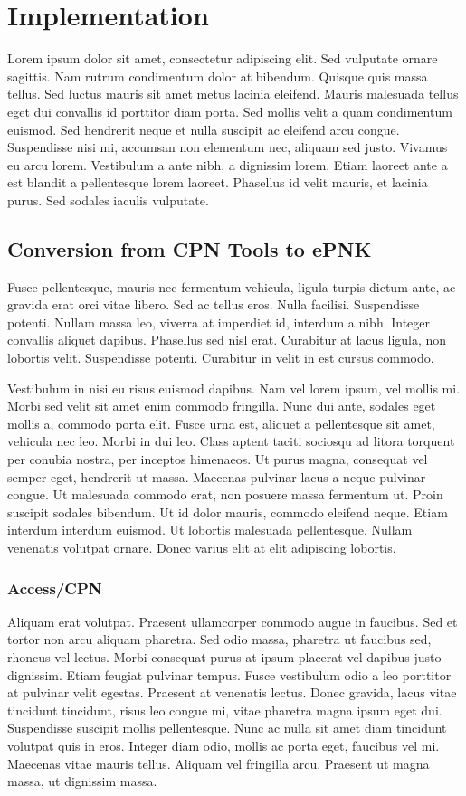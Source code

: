 \chapter{Implementation}
\label{chap:implementation}

Lorem ipsum dolor sit amet, consectetur adipiscing elit. Sed vulputate ornare sagittis. Nam rutrum condimentum dolor at bibendum. Quisque quis massa tellus. Sed luctus mauris sit amet metus lacinia eleifend. Mauris malesuada tellus eget dui convallis id porttitor diam porta. Sed mollis velit a quam condimentum euismod. Sed hendrerit neque et nulla suscipit ac eleifend arcu congue. Suspendisse nisi mi, accumsan non elementum nec, aliquam sed justo. Vivamus eu arcu lorem. Vestibulum a ante nibh, a dignissim lorem. Etiam laoreet ante a est blandit a pellentesque lorem laoreet. Phasellus id velit mauris, et lacinia purus. Sed sodales iaculis vulputate.


\section{Conversion from CPN Tools to ePNK}
Fusce pellentesque, mauris nec fermentum vehicula, ligula turpis dictum ante, ac gravida erat orci vitae libero. Sed ac tellus eros. Nulla facilisi. Suspendisse potenti. Nullam massa leo, viverra at imperdiet id, interdum a nibh. Integer convallis aliquet dapibus. Phasellus sed nisl erat. Curabitur at lacus ligula, non lobortis velit. Suspendisse potenti. Curabitur in velit in est cursus commodo.

Vestibulum in nisi eu risus euismod dapibus. Nam vel lorem ipsum, vel mollis mi. Morbi sed velit sit amet enim commodo fringilla. Nunc dui ante, sodales eget mollis a, commodo porta elit. Fusce urna est, aliquet a pellentesque sit amet, vehicula nec leo. Morbi in dui leo. Class aptent taciti sociosqu ad litora torquent per conubia nostra, per inceptos himenaeos. Ut purus magna, consequat vel semper eget, hendrerit ut massa. Maecenas pulvinar lacus a neque pulvinar congue. Ut malesuada commodo erat, non posuere massa fermentum ut. Proin suscipit sodales bibendum. Ut id dolor mauris, commodo eleifend neque. Etiam interdum interdum euismod. Ut lobortis malesuada pellentesque. Nullam venenatis volutpat ornare. Donec varius elit at elit adipiscing lobortis.

\subsection{Access/CPN}
Aliquam erat volutpat. Praesent ullamcorper commodo augue in faucibus. Sed et tortor non arcu aliquam pharetra. Sed odio massa, pharetra ut faucibus sed, rhoncus vel lectus. Morbi consequat purus at ipsum placerat vel dapibus justo dignissim. Etiam feugiat pulvinar tempus. Fusce vestibulum odio a leo porttitor at pulvinar velit egestas. Praesent at venenatis lectus. Donec gravida, lacus vitae tincidunt tincidunt, risus leo congue mi, vitae pharetra magna ipsum eget dui. Suspendisse suscipit mollis pellentesque. Nunc ac nulla sit amet diam tincidunt volutpat quis in eros. Integer diam odio, mollis ac porta eget, faucibus vel mi. Maecenas vitae mauris tellus. Aliquam vel fringilla arcu. Praesent ut magna massa, ut dignissim massa.

